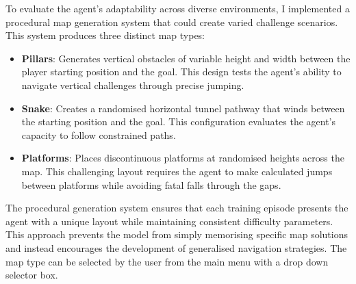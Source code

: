 To evaluate the agent's adaptability across diverse environments, I implemented a procedural map generation system that could create varied challenge scenarios. This system produces three distinct map types:

\begin{itemize}
    \item \textbf{Pillars}: Generates vertical obstacles of variable height and width between the player starting position and the goal. This design tests the agent's ability to navigate vertical challenges through precise jumping.
    \item \textbf{Snake}: Creates a randomised horizontal tunnel pathway that winds between the starting position and the goal. This configuration evaluates the agent's capacity to follow constrained paths.
    \item \textbf{Platforms}: Places discontinuous platforms at randomised heights across the map. This challenging layout requires the agent to make calculated jumps between platforms while avoiding fatal falls through the gaps.
\end{itemize}

The procedural generation system ensures that each training episode presents the agent with a unique layout while maintaining consistent difficulty parameters. 
This approach prevents the model from simply memorising specific map solutions and instead encourages the development of generalised navigation strategies.
The map type can be selected by the user from the main menu with a drop down selector box.


